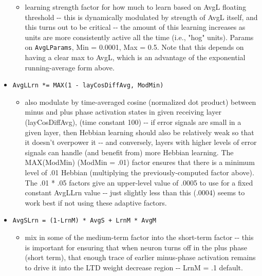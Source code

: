 \documentclass[11pt,twoside]{article}
\newif\myifpdf
\providecommand{\tightlist}{%
  \setlength{\itemsep}{.25in}\setlength{\parskip}{-.25in}}
\begin{document}
\begin{itemize}
    \begin{itemize}
	\tightlist
    \item
      learning strength factor for how much to learn based on AvgL
      floating threshold -\/- this is dynamically modulated by strength
      of AvgL itself, and this turns out to be critical -\/- the amount
      of this learning increases as units are more consistently active
      all the time (i.e., "hog" units). Params on \texttt{AvgLParams},
      Min = 0.0001, Max = 0.5. Note that this depends on having a clear
      max to AvgL, which is an advantage of the exponential
      running-average form above.
    \end{itemize}
	
  \item \texttt{AvgLLrn\ *=\ MAX(1\ -\ layCosDiffAvg,\ ModMin)}

    \begin{itemize}
	\tightlist
    \item
      also modulate by time-averaged cosine (normalized dot product)
      between minus and plus phase activation states in given receiving
      layer (layCosDiffAvg), (time constant 100) -\/- if error signals
      are small in a given layer, then Hebbian learning should also be
      relatively weak so that it doesn't overpower it -\/- and
      conversely, layers with higher levels of error signals can handle
      (and benefit from) more Hebbian learning. The MAX(ModMin) (ModMin
      = .01) factor ensures that there is a minimum level of .01 Hebbian
      (multiplying the previously-computed factor above). The .01 * .05
      factors give an upper-level value of .0005 to use for a fixed
      constant AvgLLrn value -\/- just slightly less than this (.0004)
      seems to work best if not using these adaptive factors.
    \end{itemize}
	
  \item \texttt{AvgSLrn\ =\ (1-LrnM)\ *\ AvgS\ +\ LrnM\ *\ AvgM}

    \begin{itemize}
	\tightlist
    \item
      mix in some of the medium-term factor into the short-term factor
      -\/- this is important for ensuring that when neuron turns off in
      the plus phase (short term), that enough trace of earlier
      minus-phase activation remains to drive it into the LTD weight
      decrease region -\/- LrnM = .1 default.
    \end{itemize}
	

\end{itemize}
\end{document}
